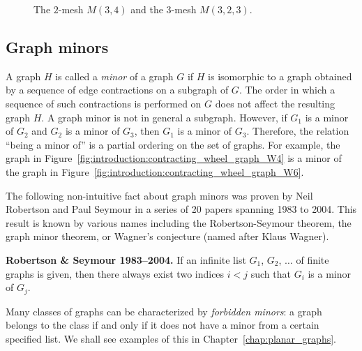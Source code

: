 \begin{figure}[!htbp]
\centering

\caption{The $2$-mesh $M(3, 4)$ and the $3$-mesh $M(3, 2, 3)$.}
\label{fig:introduction:mesh_grid_lattice}
\end{figure}



\subsection{Graph minors}

A graph $H$ is called a \emph{minor} of a graph $G$
if $H$ is isomorphic to a graph obtained by a sequence of edge
contractions on a subgraph of $G$.  The order in which a sequence of
such contractions is performed on $G$ does not affect the resulting
graph $H$. A graph minor is not in general a subgraph. However, if
$G_1$ is a minor of $G_2$ and $G_2$ is a minor of $G_3$, then $G_1$ is
a minor of $G_3$. Therefore, the relation ``being a minor of'' is a
partial ordering on the set of graphs. For example, the graph in
Figure~\ref{fig:introduction:contracting_wheel_graph_W4} is a minor of
the graph in Figure~\ref{fig:introduction:contracting_wheel_graph_W6}.

The following non-intuitive fact about graph minors was proven by
Neil Robertson and Paul
Seymour in a series of 20 papers spanning 1983
to 2004. This result is known by various names including the
Robertson-Seymour theorem, the graph minor theorem, or Wagner's
conjecture (named after Klaus
Wagner).

\begin{theorem}
\label{thm:introduction:graph_minor}
\textbf{Robertson \& Seymour 1983--2004.}
If an infinite list $G_1$, $G_2$, $\dots$ of finite graphs is given,
then there always exist two indices $i < j$ such that $G_i$ is a minor
of $G_j$.
\end{theorem}

Many classes of graphs can be characterized by
\emph{forbidden minors}: a graph belongs to the
class if and only if it does not have a minor from a certain specified
list. We shall see examples of this in Chapter~\ref{chap:planar_graphs}.



